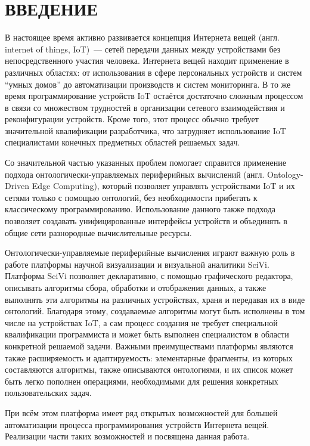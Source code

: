 \chapter*{ВВЕДЕНИЕ}

В настоящее время активно развивается концепция Интернета вещей (англ. internet of things, IoT)~--- сетей передачи данных между устройствами без непосредственного участия человека.
Интернета вещей находит применение в различных областях: от использования в сфере персональных устройств и систем "`умных домов"' до автоматизации производств и систем мониторинга.
В то же время программирование устройств IoT остаётся достаточно сложным процессом в связи со множеством трудностей в организации сетевого взаимодействия и реконфигурации устройств.
Кроме того, этот процесс обычно требует значительной квалификации разработчика, что затрудняет использование IoT специалистами конечных предметных областей решаемых задач.

Со значительной частью указанных проблем помогает справится применение подхода онтологически-управляемых периферийных вычислений (англ. Ontology-Driven Edge Computing), который позволяет управлять устройствами IoT и их сетями только с помощью онтологий, без необходимости прибегать к классическому программированию\cite{incollection:odec}.
Использование данного также подхода позволяет создавать унифицированные интерфейсы устройств и объединять в общие сети разнородные вычислительные ресурсы\cite{booktel:eon-communications}.

Онтологически-управляемые периферийные вычисления играют важную роль в работе платформы научной визуализации и визуальной аналитики SciVi\cite{article:scivi, article:scivi-overview}.
Платформа SciVi позволяет декларативно, с помощью графического редактора, описывать алгоритмы сбора, обработки и отображения данных, а также выполнять эти алгоритмы на различных устройствах, храня и передавая их в виде онтологий.
Благодаря этому, создаваемые алгоритмы могут быть исполнены в том числе на устройствах IoT, а сам процесс создания не требует специальной квалификации программиста и может быть выполнен специалистом в области конкретной решаемой задачи.
Важными преимуществами платформы являются также расширяемость и адаптируемость: элементарные фрагменты, из которых составляются алгоритмы, также описываются онтологиями, и их список может быть легко пополнен операциями, необходимыми для решения конкретных пользовательских задач.

При всём этом платформа имеет ряд открытых возможностей для большей автоматизации процесса программирования устройств Интернета вещей.
Реализации части таких возможностей и посвящена данная работа.

